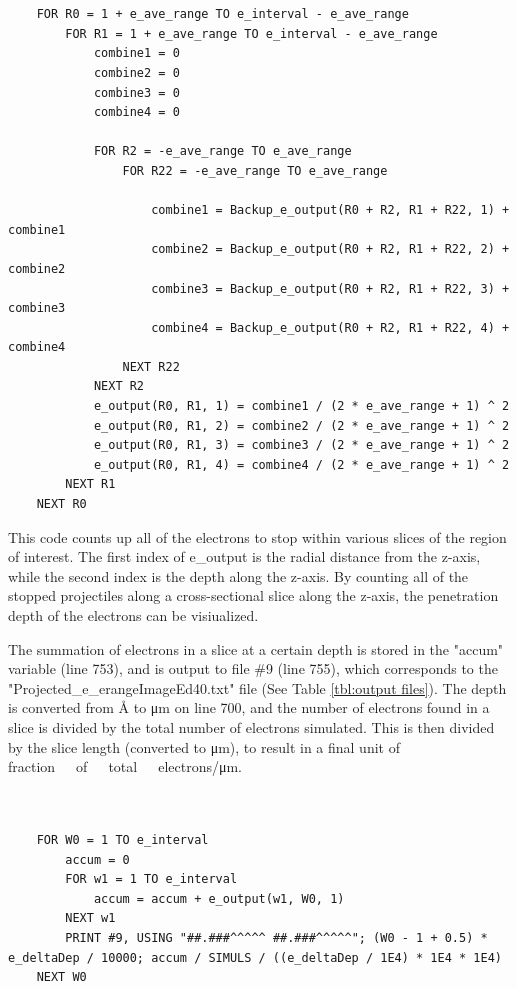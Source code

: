 \documentclass[10pt, reqno]{exam}
\begin{document}
\begin{verbatim}
    
    
    FOR R0 = 1 + e_ave_range TO e_interval - e_ave_range
        FOR R1 = 1 + e_ave_range TO e_interval - e_ave_range
            combine1 = 0
            combine2 = 0
            combine3 = 0
            combine4 = 0
    
            FOR R2 = -e_ave_range TO e_ave_range
                FOR R22 = -e_ave_range TO e_ave_range
    
                    combine1 = Backup_e_output(R0 + R2, R1 + R22, 1) + combine1
                    combine2 = Backup_e_output(R0 + R2, R1 + R22, 2) + combine2
                    combine3 = Backup_e_output(R0 + R2, R1 + R22, 3) + combine3
                    combine4 = Backup_e_output(R0 + R2, R1 + R22, 4) + combine4
                NEXT R22
            NEXT R2
            e_output(R0, R1, 1) = combine1 / (2 * e_ave_range + 1) ^ 2
            e_output(R0, R1, 2) = combine2 / (2 * e_ave_range + 1) ^ 2
            e_output(R0, R1, 3) = combine3 / (2 * e_ave_range + 1) ^ 2
            e_output(R0, R1, 4) = combine4 / (2 * e_ave_range + 1) ^ 2
        NEXT R1
    NEXT R0
\end{verbatim}

\pagebreak

This code counts up all of the electrons to stop within various slices of the region of interest. The first index of e\_output is the radial distance from the z-axis, while the second index is the depth along the z-axis. By counting all of the stopped projectiles along a cross-sectional slice along the z-axis, the penetration depth of the electrons can be visiualized. \par

The summation of electrons in a slice at a certain depth is stored in the "accum" variable (line 753), and is output to file \#9 (line 755), which corresponds to the "Projected\_e\_erangeImageEd40.txt" file (See Table \ref{tbl:output files}). The depth is converted from \si{\angstrom} to \si{\micro \meter} on line 700, and the number of electrons found in a slice is divided by the total number of electrons simulated. This is then divided by the slice length (converted to \si{\micro\meter}), to result in a final unit of \si{fraction\ of\ total\ electrons/\micro\meter}. 

\begin{verbatim}
    
    
    FOR W0 = 1 TO e_interval
        accum = 0
        FOR w1 = 1 TO e_interval
            accum = accum + e_output(w1, W0, 1)
        NEXT w1
        PRINT #9, USING "##.###^^^^^ ##.###^^^^^"; (W0 - 1 + 0.5) * e_deltaDep / 10000; accum / SIMULS / ((e_deltaDep / 1E4) * 1E4 * 1E4)
    NEXT W0
\end{verbatim}
\end{document}
